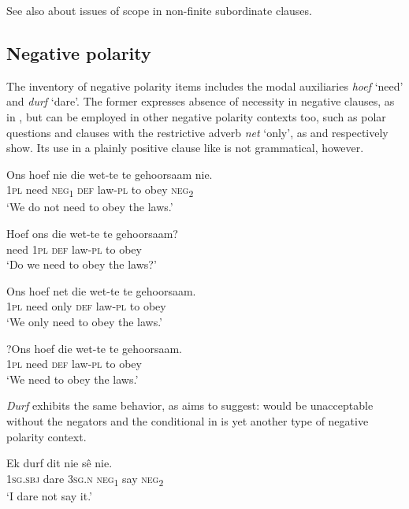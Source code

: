 \documentclass[output=paper,colorlinks,citecolor=brown]{langscibook}
\begin{document}
See also  about issues of scope in non-finite subordinate clauses.

\subsection{Negative polarity}
\label{sec:afr:4.2}
The inventory of negative polarity items includes the modal auxiliaries \textit{hoef} ‘need’ and \textit{durf} ‘dare’. The former expresses absence of necessity in negative clauses, as in , but can  be employed in other negative polarity contexts too, such as polar questions and clauses with the restrictive adverb \textit{net} ‘only’, as  and  respectively show. Its use in a plainly positive clause like  is not grammatical, however.

\ea\label{ex:afr:38}
    \ea\label{ex:afr:38a}
        \gll Ons hoef nie die wet-te te gehoorsaam nie. \\ 
             \textsc{1pl} need \textsc{neg}\textsubscript{1}  \textsc{def} law-\textsc{pl} to obey \textsc{neg}\textsubscript{2} \\
        \glt ‘We do not need to obey the laws.’
    
    \ex\label{ex:afr:38b}
        \gll Hoef ons die wet-te te gehoorsaam? \\
             need \textsc{1pl} \textsc{def} law-\textsc{pl} to obey\\
        \glt  ‘Do we need to obey the laws?’
    
    \ex\label{ex:afr:38c}
        \gll Ons hoef net die wet-te te gehoorsaam. \\ 
             \textsc{1pl} need only \textsc{def} law-\textsc{pl} to obey \\
        \glt ‘We only need to obey the laws.’
    
    \ex\label{ex:afr:38d}
        \gll ?Ons hoef die wet-te te gehoorsaam. \\
             \textsc{1pl} need \textsc{def} law-\textsc{pl} to obey \\
        \glt ‘We need to obey the laws.’
    \z
\z 

\textit{Durf} exhibits the same behavior, as  aims to suggest:  would be unacceptable without the negators and the conditional in  is yet another type of negative polarity context.

\ea\label{ex:afr:39}
    \ea\label{ex:afr:39a}
        \gll Ek durf dit nie sê nie. \\ 
             \textsc{1sg.sbj} dare \textsc{3sg.n} \textsc{neg}\textsubscript{1} say \textsc{neg}\textsubscript{2} \\
        \glt ‘I dare not say it.’
    
\end{document}
